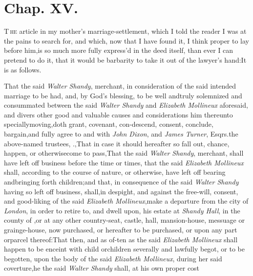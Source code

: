 \documentclass{article}
\begin{document}
\section{Chap. XV.}

\lettrine{T}{\,he} article in my mother’s marriage-settlement, which I
told the reader I was at the pains to search for, and which, now that I have
found it, I think proper to lay before him,\tsk  is so much more fully
express’d in the deed itself, than ever I can pretend to do it, that it
would be barbarity to take it out of the lawyer’s hand:\tsk  It is as
follows.

\noindent\enspace
\begin{story}{} 
    \quad That the said \textit{Walter Shandy}, merchant, 
in consideration of the said intended
marriage to be had, and, by God’s blessing, to be well and\pb truly solemnized and consummated
between the said \textit{Walter Shandy} and \textit{Elizabeth Mollineux} aforesaid,
and divers other good and valuable causes and considerations him thereunto
specially\break moving,\tsk  doth grant, covenant, con-\break descend, consent, conclude,
bargain,\break and fully agree to and with \textit{John Dixon}, and \textit{James
Turner}, Esqrs.\@ the above-\break named trustees, \etc \etc.\tsk{},\tsk\break  That in case it should hereafter so fall out, chance, happen, or
otherwise\break come to pass,\tsk  That the said \textit{Walter Shandy}, merchant,
shall have left off business before the time or times, that the said
\textit{Elizabeth Mollineux} shall, according to the course of nature, or\break
otherwise, have left off bearing and\break bringing forth children;\tsk  and
    that,\break
in consequence of the said \textit{Walter Shan\-dy} having so left off business, 
shall,\pb in despight, and against the free-will, consent, and good-liking of the
said\break
\textit{Elizabeth Mollineux},\tsk  make a departure from the city of
\textit{London}, in order to retire to, and dwell upon, his estate at \textit{Shandy
Hall}, in the county of \tsh  ,\break or at any other country-seat,
castle, hall, mansion-house, messuage or grainge-house, now purchased, or
hereafter to be purchased, or upon any part or\break parcel thereof:\tsk  That then,
and as of-\break ten as the said \textit{Elizabeth Mollineux} shall happen to be enceint
with child or\break children severally and lawfully begot, or to be begotten, upon
the body of the said \textit{Elizabeth Mollineux}, during her said
coverture,\tsk  he the said \textit{Walter Shandy} shall, at his own proper cost

\end{story}
\end{document}
